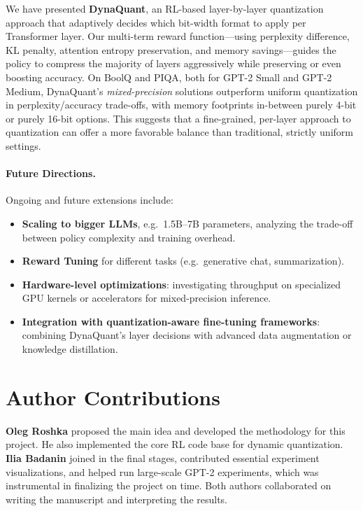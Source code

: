 \documentclass{article}
\begin{document}
	We have presented \textbf{DynaQuant}, an RL-based layer-by-layer quantization approach that adaptively decides which bit-width format to apply per Transformer layer. Our multi-term reward function—using perplexity difference, KL penalty, attention entropy preservation, and memory savings—guides the policy to compress the majority of layers aggressively while preserving or even boosting accuracy. On BoolQ and PIQA, both for GPT-2 Small and GPT-2 Medium, DynaQuant's \emph{mixed-precision} solutions outperform uniform quantization in perplexity/accuracy trade-offs, with memory footprints in-between purely 4-bit or purely 16-bit options. This suggests that a fine-grained, per-layer approach to quantization can offer a more favorable balance than traditional, strictly uniform settings.
		
	
	\paragraph{Future Directions.}
	Ongoing and future extensions include:
	\begin{itemize}
		\item \textbf{Scaling to bigger LLMs}, e.g.\ 1.5B–7B parameters, analyzing the trade-off between policy complexity and training overhead.
		\item \textbf{Reward Tuning} for different tasks (e.g.\ generative chat, summarization).
		\item \textbf{Hardware-level optimizations}: investigating throughput on specialized GPU kernels or accelerators for mixed-precision inference.
		\item \textbf{Integration with quantization-aware fine-tuning frameworks}: combining DynaQuant's layer decisions with advanced data augmentation or knowledge distillation.
	\end{itemize}
	
	\section{Author Contributions}
	\label{sec:author-contributions}
	
	\textbf{Oleg Roshka} proposed the main idea and developed the methodology for this project. 
	He also implemented the core RL code base for dynamic quantization. 
	\textbf{Ilia Badanin} joined in the final stages, contributed essential experiment visualizations, and helped run large-scale GPT-2 experiments, which was instrumental in finalizing the project on time. 
	Both authors collaborated on writing the manuscript and interpreting the results.
\end{document}
